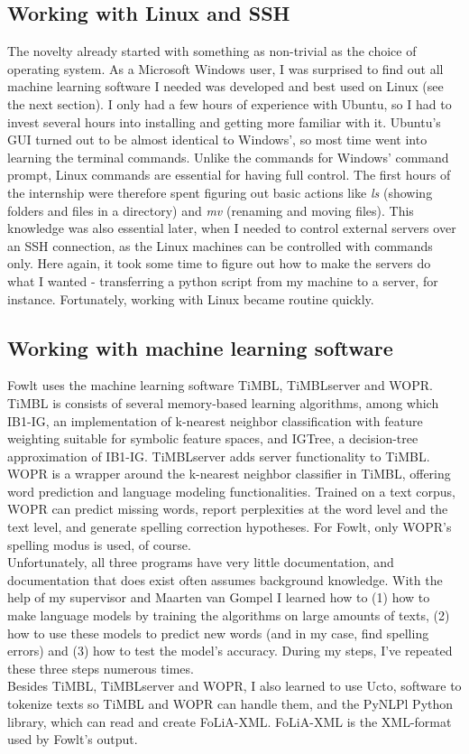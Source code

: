 \documentclass[12pt]{article}
\begin{document}
\subsection{Working with Linux and SSH}
The novelty already started with something as non-trivial as the choice of operating system. As a Microsoft Windows user, I was surprised to find out all machine learning software I needed was developed and best used on Linux (see the next section). I only had a few hours of experience with Ubuntu, so I had to invest several hours into installing and getting more familiar with it. Ubuntu's GUI turned out to be almost identical to Windows', so most time went into learning the terminal commands. Unlike the commands for Windows' command prompt, Linux commands are essential for having full control. The first hours of the internship were therefore spent figuring out basic actions like \emph{ls} (showing folders and files in a directory) and \emph{mv} (renaming and moving files). This knowledge was also essential later, when I needed to control external servers over an SSH connection, as the Linux machines can be controlled with commands only. Here again, it took some time to figure out how to make the servers do what I wanted - transferring a python script from my machine to a server, for instance. Fortunately, working with Linux became routine quickly.


\subsection{Working with machine learning software}
Fowlt uses the machine learning software TiMBL, TiMBLserver and WOPR. TiMBL is consists of several memory-based learning algorithms, among which IB1-IG, an implementation of k-nearest neighbor classification with feature weighting suitable for symbolic feature spaces, and IGTree, a decision-tree approximation of IB1-IG. TiMBLserver adds server functionality to TiMBL. WOPR is a wrapper around the k-nearest neighbor classifier in TiMBL, offering word prediction and language modeling functionalities. Trained on a text corpus, WOPR can predict missing words, report perplexities at the word level and the text level, and generate spelling correction hypotheses. For Fowlt, only WOPR's spelling modus is used, of course.
\\\indent
Unfortunately, all three programs have very little documentation, and documentation that does exist often assumes background knowledge. With the help of my supervisor and Maarten van Gompel I learned how to (1) how to make language models by training the algorithms on large amounts of texts, (2) how to use these models to predict new words (and in my case, find spelling errors) and (3) how to test the model's accuracy. During my steps, I've repeated these three steps numerous times.
\\\indent
Besides TiMBL, TiMBLserver and WOPR, I also learned to use Ucto, software to tokenize texts so TiMBL and WOPR can handle them, and the PyNLPl Python library, which can read and create FoLiA-XML. FoLiA-XML is the XML-format used by Fowlt's output.
\end{document}
